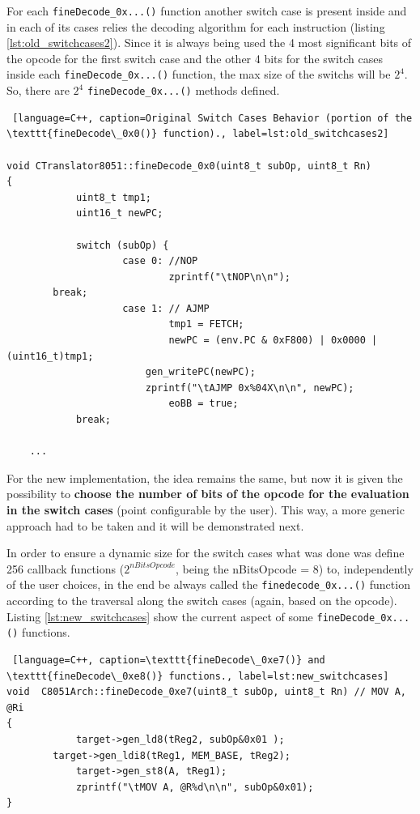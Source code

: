 \documentclass[12pt]{article}
\newcounter{subsubsubsection}[subsubsection]
\begin{document}
{For each \texttt{fineDecode\_0x...()} function another switch case is present inside and in each of its cases relies the decoding algorithm for each instruction (listing \ref{lst:old_switchcases2}). Since it is always being used the 4 most significant bits of the opcode for the first switch case and the other 4 bits for the switch cases inside each \texttt{fineDecode\_0x...()} function, the max size of the switchs will be $2^{4}$. So, there are $2^{4}$ \texttt{fineDecode\_0x...()} methods defined.

\begin{lstlisting} [language=C++, caption=Original Switch Cases Behavior (portion of the \texttt{fineDecode\_0x0()} function)., label=lst:old_switchcases2]

void CTranslator8051::fineDecode_0x0(uint8_t subOp, uint8_t Rn)
{
			uint8_t tmp1;
			uint16_t newPC;
		
			switch (subOp) {
					case 0: //NOP
							zprintf("\tNOP\n\n");
	  	break;
					case 1: // AJMP
							tmp1 = FETCH;
							newPC = (env.PC & 0xF800) | 0x0000 | (uint16_t)tmp1; 
	    				gen_writePC(newPC);		
	    				zprintf("\tAJMP 0x%04X\n\n", newPC);
							eoBB = true;		
			break;
		
    ...

\end{lstlisting}

For the new implementation, the idea remains the same, but now it is given the possibility to \textbf{choose the number of bits of the opcode for the evaluation in the switch cases} (point configurable by the user). This way, a more generic approach had to be taken and it will be demonstrated next.


  In order to ensure a dynamic size for the switch cases what was done was define 256 callback functions ($2^{nBitsOpcode}$, being the nBitsOpcode = 8) to, independently of the user choices, in the end be always called the \texttt{finedecode\_0x...()} function according to the traversal along the switch cases (again, based on the opcode). Listing \ref{lst:new_switchcases} show the current aspect of some \texttt{fineDecode\_0x...()} functions.

\begin{lstlisting} [language=C++, caption=\texttt{fineDecode\_0xe7()} and \texttt{fineDecode\_0xe8()} functions., label=lst:new_switchcases]
void  C8051Arch::fineDecode_0xe7(uint8_t subOp, uint8_t Rn)	// MOV A, @Ri
{   
			target->gen_ld8(tReg2, subOp&0x01 );
  		target->gen_ldi8(tReg1, MEM_BASE, tReg2);
			target->gen_st8(A, tReg1);
			zprintf("\tMOV A, @R%d\n\n", subOp&0x01);  
} 


\end{lstlisting}}
\end{document}
